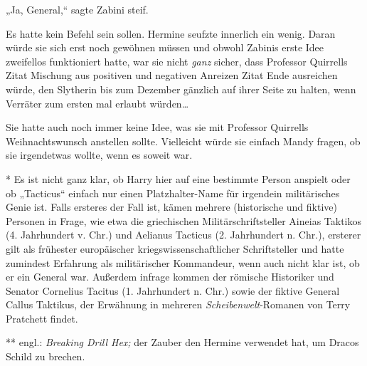 „Ja, General,“ sagte Zabini steif.

Es hatte kein Befehl sein sollen. Hermine seufzte innerlich ein wenig. Daran würde sie sich erst noch gewöhnen müssen und obwohl Zabinis erste Idee zweifellos funktioniert hatte, war sie nicht \emph{ganz} sicher, dass Professor Quirrells Zitat Mischung aus positiven und negativen Anreizen Zitat Ende ausreichen würde, den Slytherin bis zum Dezember gänzlich auf ihrer Seite zu halten, wenn Verräter zum ersten mal erlaubt würden…

Sie hatte auch noch immer keine Idee, was sie mit Professor Quirrells Weihnachtswunsch anstellen sollte. Vielleicht würde sie einfach Mandy fragen, ob sie irgendetwas wollte, wenn es soweit war.


* Es ist nicht ganz klar, ob Harry hier auf eine bestimmte Person anspielt oder ob „Tacticus“ einfach nur einen Platzhalter-Name für irgendein militärisches Genie ist. Falls ersteres der Fall ist, kämen mehrere (historische und fiktive) Personen in Frage, wie etwa die griechischen Militärschriftsteller Aineias Taktikos (4. Jahrhundert v. Chr.) und Aelianus Tacticus (2. Jahrhundert n. Chr.), ersterer gilt als frühester europäischer kriegswissenschaftlicher Schriftsteller und hatte zumindest Erfahrung als militärischer Kommandeur, wenn auch nicht klar ist, ob er ein General war. Außerdem infrage kommen der römische Historiker und Senator Cornelius Tacitus (1. Jahrhundert n. Chr.) sowie der fiktive General Callus Taktikus, der Erwähnung in mehreren \emph{Scheibenwelt}-Romanen von Terry Pratchett findet.

** engl.: \emph{Breaking Drill Hex;} der Zauber den Hermine verwendet hat, um Dracos Schild zu brechen.
